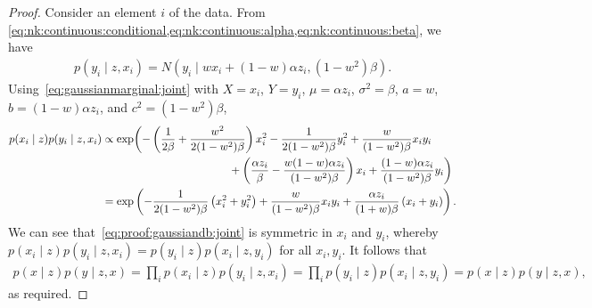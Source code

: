 \documentclass[10pt,twocolumn,letterpaper]{article}
\begin{document}
\begin{proof}
  Consider an element $i$ of the data.
  From \cref{eq:nk:continuous:conditional,eq:nk:continuous:alpha,eq:nk:continuous:beta}, we have
  \begin{align}
    p(y_{i} \mid z, x_{i}) = N(y_{i} \mid wx_{i} + (1 - w)\alpha z_{i}, (1 - w^{2}) \beta).
    \label{eq:proof:gaussiandb:conditional}
  \end{align}
  Using~\eqref{eq:gaussianmarginal:joint} with $X = x_{i}$, $Y = y_{i}$, $\mu = \alpha z_{i}$, $\sigma^{2} = \beta$, $a = w$, $b = (1 - w) \alpha z_{i}$, and $c^{2} = (1 - w^{2}) \beta$,
  \begin{align}
    p(x_{i} \mid z)p(y_{i} \mid z, x_{i})
    & \propto
      \exp\biggl(
      - \left(\frac{1}{2\beta} + \frac{w^{2}}{2(1 - w^{2}) \beta}\right) x_{i}^{2}
      - \frac{1}{2(1 - w^{2}) \beta} y_{i}^{2}
      + \frac{w}{(1 - w^{2}) \beta} x_{i}y_{i}
      \nonumber \\
    & \hspace{4.0cm}
      + \left(\frac{\alpha z_{i}}{\beta} - \frac{w (1 - w) \alpha z_{i}}{(1 - w^{2}) \beta}\right) x_{i}
      + \frac{(1 - w) \alpha z_{i}}{(1 - w^{2}) \beta} y_{i}
      \biggl)
      \\
    & =
      \exp\left(
        - \frac{1}{2(1 - w^{2}) \beta} \left(x_{i}^{2} + y_{i}^{2}\right)
        + \frac{w}{(1 - w^{2}) \beta} x_{i}y_{i}
        + \frac{\alpha z_{i}}{(1 + w) \beta} \left(x_{i} + y_{i}\right)
      \right)
      \label{eq:proof:gaussiandb:joint}
      .
  \end{align}
  We can see that~\eqref{eq:proof:gaussiandb:joint} is symmetric in $x_{i}$ and $y_{i}$, whereby $p(x_{i} \mid z)p(y_{i} \mid z, x_{i}) = p(y_{i} \mid z)p(x_{i} \mid z, y_{i})$ for all $x_{i},y_{i}$.
  It follows that
  \begin{align}
    p(x \mid z)p(y \mid z, x)
    =
    \prod_{i} p(x_{i} \mid z)p(y_{i} \mid z, x_{i})
    =
    \prod_{i} p(y_{i} \mid z)p(x_{i} \mid z, y_{i})
    =
    p(x \mid z)p(y \mid z, x)
    ,
  \end{align}
  as required.
\end{proof}

\categoricaldb*
\end{document}
